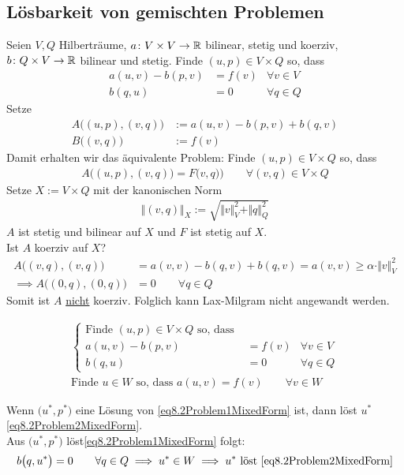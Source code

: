 \subsection{Lösbarkeit von gemischten Problemen}
Seien $V,Q$ Hilberträume, $a\colon V\times V\to\mathbb{R}$ bilinear, stetig und koerziv, $b\colon Q\times V\to\mathbb{R}$ bilinear und stetig.\nl
Finde $(u,p)\in V\times Q$ so, dass
\begin{align*}
	a(u,v)-b(p,v)&=f(v) &\forall v\in V\\
	b(q,u) &=0 &\forall q\in Q
\end{align*}
Setze
\begin{align*}
	A\big((u,p),(v,q)\big) &:=a(u,v)-b(p,v)+b(q,v)\\
	B\big((v,q)\big) &:= f(v)
\end{align*}
Damit erhalten wir das äquivalente Problem:
Finde $(u,p)\in V\times Q$ so, dass
\begin{align*}
	A\big((u,p),(v,q)\big)=F\big(v,q)\big) \qquad\forall(v,q)\in V\times Q
\end{align*}
Setze $X:=V\times Q$ mit der kanonischen Norm
\begin{align*}
	\big\Vert(v,q)\big\Vert_X:=\sqrt{\Vert v\Vert_V^2+\Vert q\Vert_Q^2}
\end{align*}
$A$ ist stetig und bilinear auf $X$ und $F$ ist stetig auf $X$.\\
Ist $A$ koerziv auf $X$?
\begin{align*}
	A\big((v,q),(v,q)\big)
	&=a(v,v)-b(q,v)+b(q,v)
	=a(v,v)\geq\alpha\cdot\Vert v\Vert^2_V\\
	\implies
	A\big((0,q),(0,q)\big)&=0\qquad\forall q\in Q
\end{align*}
Somit ist $A$ \underline{nicht} koerziv.
Folglich kann Lax-Milgram nicht angewandt werden.

\begin{align}\label{eq8.2Problem1MixedForm}\tag{1}
		\left\lbrace
		\begin{array}{rlrr}
			\text{Finde }(u,p)\in V\times Q\text{ so, dass }&\\
			a(u,v)-b(p,v)&=f(v) &\forall v\in V\\
			b(q,u)&=0 &\forall q\in Q
		\end{array}\right.\\
		\label{eq8.2Problem2MixedForm}\tag{2}
		\text{Finde $u\in W$ so, dass }
		a(u,v)= f(v)\qquad\forall v\in W
\end{align}

Wenn $\big(u^\ast,p^\ast\big)$ eine Lösung von \eqref{eq8.2Problem1MixedForm} ist, dann löst $u^\ast$ \eqref{eq8.2Problem2MixedForm}.\\
Aus $\big(u^\ast,p^\ast\big)$ löst\eqref{eq8.2Problem1MixedForm} folgt:
\begin{align*}
	b\big(q,u^\ast\big)=0\qquad\forall q\in Q
	\implies u^\ast\in W
	\implies u^\ast\text{ löst }\eqref{eq8.2Problem2MixedForm}
\end{align*}

